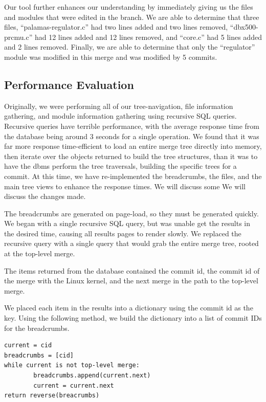 \documentclass[conference, draftclsnofoot]{IEEEtran}
\begin{document}
Our tool further enhances our understanding by immediately giving us the files
and modules that were edited in the branch. We are able to determine that three
files, ``palamas-regulator.c'' had two lines added and two lines removed,
``dbx500-prcmu.c'' had 12 lines added and 12 lines removed, and ``core.c'' had 5
lines added and 2 lines removed. Finally, we are able to determine that only the
``regulator'' module was modified in this merge and was modified by 5 commits.

\subsection{Performance Evaluation}
Originally, we were performing all of our tree-navigation, file information
gathering, and module information gathering using recursive SQL queries.
Recursive queries have terrible performance, with the average response time
from the database being around 3 seconds for a single operation. We found that
it was far more response time-efficient to load an entire merge tree directly
into memory, then iterate over the objects returned to build the tree
structures, than it was to have the dbms perform the tree traversals, building
the specific trees for a commit. At this time, we have re-implemented the
breadcrumbs, the files, and the main tree views to enhance the response times.
We will discuss some We will discuss the changes made.

The breadcrumbs are generated on page-load, so they must be generated quickly.
We began with a single recursive SQL query, but was unable get the results in
the desired time, causing all results pages to render slowly. We replaced the
recursive query with a single query that would grab the entire merge tree,
rooted at the top-level merge.

The items returned from the database contained the commit id, the commit id of
the merge with the Linux kernel, and the next merge in the path to the
top-level merge.

We placed each item in the results into a dictionary using the commit id as the
key. Using the following method, we build the dictionary into a list of commit
IDs for the breadcrumbs.

\begin{verbatim}
current = cid
breadcrumbs = [cid]
while current is not top-level merge:
        breadcrumbs.append(current.next)
        current = current.next
return reverse(breacrumbs)
\end{verbatim}
\end{document}
